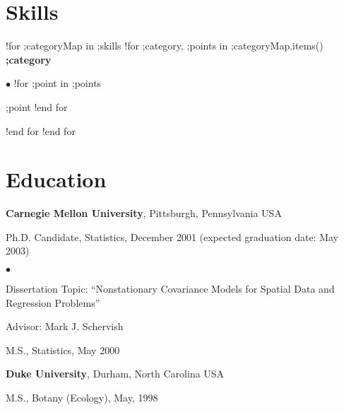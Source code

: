 \documentclass[margin,line]{res}
\newenvironment{list1}{
  \begin{list}{\ding{113}}{%
      \setlength{\itemsep}{0in}
      \setlength{\parsep}{0in} \setlength{\parskip}{0in}
      \setlength{\topsep}{0in} \setlength{\partopsep}{0in}
      \setlength{\leftmargin}{0.17in}}}{\end{list}}
\newenvironment{list2}{
  \begin{list}{$\bullet$}{%
  }}{\end{list}}
\begin{document}
\address{;contact.phone\hspace{1cm};contact.email}

\begin{resume}

\section{Skills}
!for ;categoryMap in ;skills
    !for ;category, ;points in ;categoryMap.items()
        {\bf ;category}
        \begin{list2}
        !for ;point in ;points
            \item ;point
        !end for
        \end{list2}
    !end for
!end for

\section{\sc Education}
{\bf Carnegie Mellon University}, Pittsburgh, Pennsylvania USA\\
\vspace*{-.1in}
\begin{list1}
\item[] Ph.D. Candidate, Statistics, December 2001 (expected
  graduation date: May 2003)
\begin{list2}
\vspace*{.05in}
\item Dissertation Topic:  ``Nonstationary Covariance Models for
  Spatial Data and Regression Problems''
\item Advisor:  Mark J. Schervish
\end{list2}
\vspace*{.05in}
\item[] M.S., Statistics,  May 2000
\end{list1}

{\bf Duke University}, Durham, North Carolina USA\\
\vspace*{-.1in}
\begin{list1}
\item[] M.S., Botany (Ecology),  May, 1998
\end{list1}


\end{resume}
\end{document}
